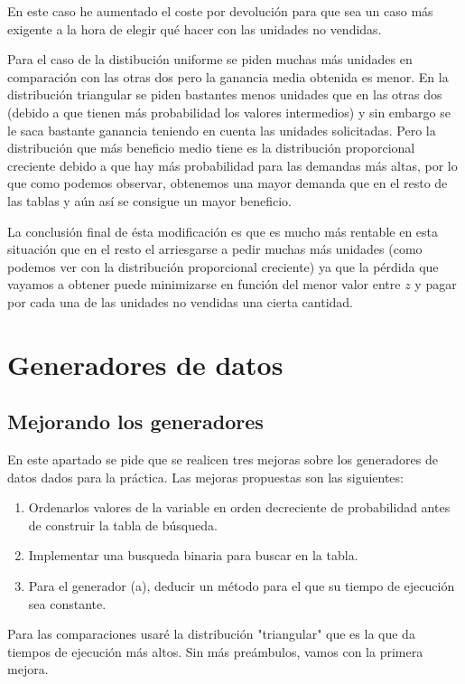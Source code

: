 \documentclass[11pt,a4paper]{report}
\begin{document}
En este caso he aumentado el coste por devolución para que sea un caso más exigente a la hora de elegir qué hacer con las unidades no vendidas. 

Para el caso de la distibución uniforme se piden muchas más unidades en comparación con las otras dos pero la ganancia media obtenida es menor. En la distribución triangular se piden bastantes menos unidades que en las otras dos (debido a que tienen más probabilidad los valores intermedios) y sin embargo se le saca bastante ganancia teniendo en cuenta las unidades solicitadas. Pero la distribución que más beneficio medio tiene es la distribución proporcional creciente debido a que hay más probabilidad para las demandas más altas, por lo que como podemos observar, obtenemos una mayor demanda que en el resto de las tablas y aún así se consigue un mayor beneficio.

La conclusión final de ésta modificación es que es mucho más rentable en esta situación que en el resto el arriesgarse a pedir muchas más unidades (como podemos ver con la distribución proporcional creciente) ya que la pérdida que vayamos a obtener puede minimizarse en función del menor valor entre $z$ y pagar por cada una de las unidades no vendidas una cierta cantidad.

\newpage

\chapter{Generadores de datos}
\newpage
\section{Mejorando los generadores}
En este apartado se pide que se realicen tres mejoras sobre los generadores de datos dados para la práctica. Las mejoras propuestas son las siguientes:
\begin{enumerate}
	\item{Ordenarlos valores de la variable en orden decreciente de probabilidad antes de construir la tabla de búsqueda.}
	\item{Implementar una busqueda binaria para buscar en la tabla.}
	\item{Para el generador (a), deducir un método para el que su tiempo de ejecución sea constante.}
\end{enumerate}

Para las comparaciones usaré la distribución "triangular" que es la que da tiempos de ejecución más altos. Sin más preámbulos, vamos con la primera mejora.
\end{document}
